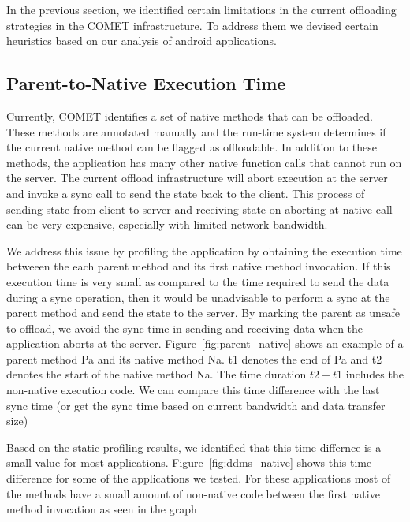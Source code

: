 In the previous section, we identified certain limitations in the current offloading strategies
in the COMET infrastructure. To address them we devised certain heuristics based on our analysis
of android applications.

\subsection{Parent-to-Native Execution Time}
Currently, COMET identifies a set of native methods that can be offloaded. These methods are annotated manually
and the run-time system determines if the current native method can be flagged as offloadable. In addition to these methods, the application has many other native function calls
that cannot run on the server. The current offload infrastructure will abort execution at the server and invoke a sync
call to send the state back to the client. This process of sending state from client to server and receiving state on
aborting at native call can be very expensive, especially with limited network bandwidth.

We address this issue by profiling the application by obtaining the execution time betweeen the each parent method and its
first native method invocation. If this execution time is very small as compared to the time required to send the data during
a sync operation, then it would be unadvisable to perform a sync at the parent method and send the state to the server. By marking the parent as
unsafe to offload, we avoid the sync time in sending and receiving data when the application aborts at the server.
Figure~\ref{fig:parent_native} shows an example of a parent method Pa and its native method Na. t1 denotes the end of Pa and t2
denotes the start of the native method Na. The time duration $t2-t1$ includes the non-native execution code. We can compare this
time difference with the last sync time (or get the sync time based on current bandwidth and data transfer size)

Based on the static profiling results, we identified that this time differnce is a small value for most applications.
Figure~\ref{fig:ddms_native} shows this time difference for some of the applications we tested. For these applications
most of the methods have a small amount of non-native code between the first native method invocation as seen in the
graph

